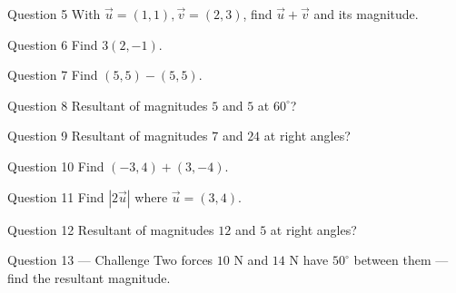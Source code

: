 \documentclass[11pt]{article}
\begin{document}
\begin{qbox}{Question 5}
With $\vec u=(1,1),\vec v=(2,3)$, find $\vec u+\vec v$ and its magnitude.\workspace{2.4cm}
\end{qbox}

\begin{qbox}{Question 6}
Find $3(2,-1)$.\workspace{2.4cm}
\end{qbox}

\begin{qbox}{Question 7}
Find $(5,5)-(5,5)$.\workspace{2.4cm}
\end{qbox}

\begin{qbox}{Question 8}
Resultant of magnitudes $5$ and $5$ at $60^\circ$?\workspace{2.4cm}
\end{qbox}

\begin{qbox}{Question 9}
Resultant of magnitudes $7$ and $24$ at right angles?\workspace{2.4cm}
\end{qbox}

\begin{qbox}{Question 10}
Find $(-3,4)+(3,-4)$.\workspace{2.4cm}
\end{qbox}

\begin{qbox}{Question 11}
Find $|2\vec u|$ where $\vec u=(3,4)$.\workspace{2.4cm}
\end{qbox}

\begin{qbox}{Question 12}
Resultant of magnitudes $12$ and $5$ at right angles?\workspace{2.4cm}
\end{qbox}

\begin{qbox}{Question 13 --- Challenge}
Two forces $10$ N and $14$ N have $50^\circ$ between them — find the resultant magnitude.\workspace{3cm}
\end{qbox}

\clearpage
{}
\end{document}

